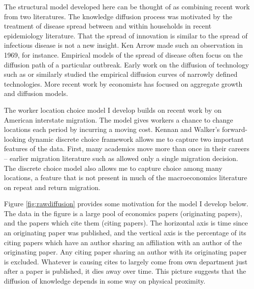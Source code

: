 The structural model developed here can be thought of as combining recent work from two literatures.
The knowledge diffusion process was motivated by the treatment of disease
spread between and within households in recent epidemiology literature.\citep{cauchemez2004bayesian}
That the spread of innovation is similar
to the spread of infectious disease is not a new insight. Ken Arrow made
such an observation in 1969, for instance.\footnotemark{}  Empirical models of the spread of disease
often focus on the diffusion path of a particular outbreak.
Early work on the diffusion of technology such as \citet{griliches1957hybrid} or \citet{rogers1962diffusion}
similarly studied the empirical diffusion curves of narrowly
defined technologies. More recent work by economists has focused on
aggregate growth and diffusion models.\citep{caballero1993high, kortum1997research, eaton1999international,  lucas2008ideas, chor2013cumulative}

The worker location choice model I develop builds on recent work by \citet{kennan2011effect} on American interstate migration.
The model gives workers a chance to change locations each period by incurring a moving cost.  Kennan and Walker's forward-looking dynamic discrete choice framework allows me to capture two important features of the data.  First, many academics move more than once in their 
careers -- earlier migration literature such as \citet{dahl2002mobility} allowed only a single migration decision.  The discrete choice model also allows me to capture choice among many locations, a feature that is not present in much of the macroeconomics literature on repeat and return migration.\citep{dos2003migration, dustmann2003return}

Figure \ref{fig:rawdiffusion} provides some
motivation for the model I develop below. The data in
the figure is a large pool of economics papers (originating papers), 
and the papers which cite them (citing papers).  The horizontal axis
is time since an originating paper was published, and the vertical
axis is the percentage of its citing papers which have an author
sharing an affiliation with an author of the originating paper.
Any citing paper sharing an author with its originating paper is
excluded. Whatever is causing cites to largely come from own department
just after a paper is published, it dies away over time. This picture
suggests that the diffusion of knowledge depends in some way on physical
proximity.

